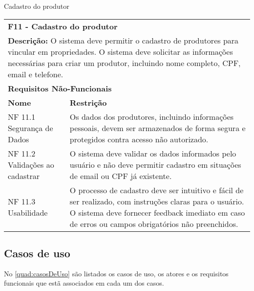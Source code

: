 \begin{tabframed}[htb]
  \caption{Cadastro do produtor}
  \label{quad:requisitoCadastroProdutor}
  \renewcommand{\arraystretch}{1.5}
  \begin{tabular}{|l|l|}
    \cline{1-2}
    \multicolumn{2}{|l|}{\textbf{F11 - Cadastro do produtor} }
    \\ \cline{1-2}

    \multicolumn{2}{|p{15cm}|}{
    \raggedright \textbf{Descrição:} O sistema deve permitir o cadastro de produtores para vincular em propriedades. O sistema deve solicitar as informações necessárias para criar um produtor, incluindo nome completo, CPF, email e telefone.
    }
    \\ \cline{1-2}

    \multicolumn{2}{|l|}{\textbf{Requisitos Não-Funcionais}}
    \\ \cline{1-2}

    \textbf{Nome}                   &
    \textbf{Restrição}
    \\ \cline{1-2}

    NF 11.1 Segurança de Dados      &
    \multicolumn{1}{|p{8cm}|}{\raggedright Os dados dos produtores, incluindo informações pessoais, devem ser armazenados de forma segura e protegidos contra acesso não autorizado.}
    \\ \cline{1-2}

    NF 11.2 Validações ao cadastrar &
    \multicolumn{1}{|p{8cm}|}{\raggedright O sistema deve validar os dados informados pelo usuário e não deve permitir cadastro em situações de email ou CPF já existente.}
    \\ \cline{1-2}

    NF 11.3 Usabilidade             &
    \multicolumn{1}{|p{8cm}|}{\raggedright O processo de cadastro deve ser intuitivo e fácil de ser realizado, com instruções claras para o usuário. O sistema deve fornecer feedback imediato em caso de erros ou campos obrigatórios não preenchidos.}
    \\ \cline{1-2}
  \end{tabular}
  \fonte{} %
\end{tabframed}

\clearpage

\subsection{Casos de uso}\label{subsec:casosDeUso}
No \autoref{quad:casosDeUso} são listados os casos de uso, os atores e os requisitos funcionais que estã associados em cada um dos casos.

